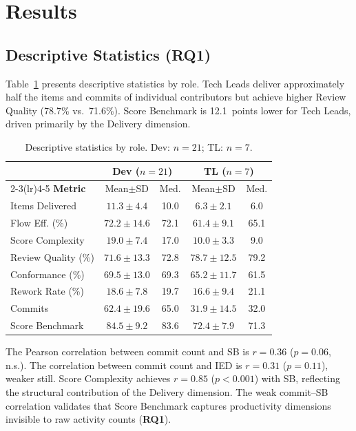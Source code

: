 \documentclass[conference]{IEEEtran}
\begin{document}
\section{Results}
\label{sec:results}

\subsection{Descriptive Statistics (RQ1)}

Table~\ref{tab:desc} presents descriptive statistics by role. Tech Leads deliver
approximately half the items and commits of individual contributors but achieve
higher Review Quality (78.7\% vs.\ 71.6\%). Score Benchmark is 12.1~points lower
for Tech Leads, driven primarily by the Delivery dimension.

\begin{table}[htbp]
  \centering
  \caption{Descriptive statistics by role. Dev: $n=21$; TL: $n=7$.}
  \label{tab:desc}
  \small
  \setlength{\tabcolsep}{3pt}
  \begin{tabular}{lcccc}
    \toprule
    & \multicolumn{2}{c}{\textbf{Dev ($n=21$)}} & \multicolumn{2}{c}{\textbf{TL ($n=7$)}} \\
    \cmidrule(lr){2-3}\cmidrule(lr){4-5}
    \textbf{Metric} & Mean$\pm$SD & Med. & Mean$\pm$SD & Med. \\
    \midrule
    Items Delivered      & $11.3\pm4.4$ & 10.0 & $6.3\pm2.1$  & 6.0  \\
    Flow Eff. (\%)       & $72.2\pm14.6$& 72.1 & $61.4\pm9.1$ & 65.1 \\
    Score Complexity     & $19.0\pm7.4$ & 17.0 & $10.0\pm3.3$ & 9.0  \\
    Review Quality (\%)  & $71.6\pm13.3$& 72.8 & $78.7\pm12.5$& 79.2 \\
    Conformance (\%)     & $69.5\pm13.0$& 69.3 & $65.2\pm11.7$& 61.5 \\
    Rework Rate (\%)     & $18.6\pm7.8$ & 19.7 & $16.6\pm9.4$ & 21.1 \\
    Commits              & $62.4\pm19.6$& 65.0 & $31.9\pm14.5$& 32.0 \\
    Score Benchmark      & $84.5\pm9.2$ & 83.6 & $72.4\pm7.9$ & 71.3 \\
    \bottomrule
  \end{tabular}
\end{table}

The Pearson correlation between commit count and SB is $r=0.36$ ($p=0.06$, n.s.).
The correlation between commit count and IED is $r=0.31$ ($p=0.11$), weaker
still. Score Complexity achieves $r=0.85$ ($p<0.001$) with SB, reflecting the
structural contribution of the Delivery dimension. The weak commit--SB correlation
validates that Score Benchmark captures productivity dimensions invisible to raw
activity counts (\textbf{RQ1}).
\end{document}
